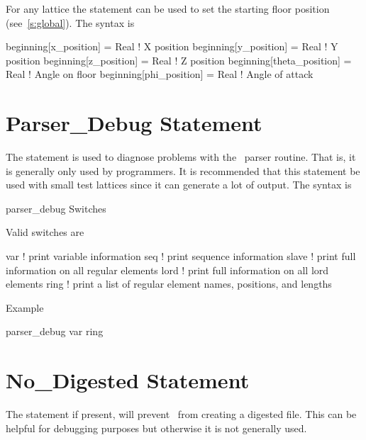 For any lattice the  statement can be used to set the starting floor position 
(see~\ref{s:global}). The syntax is
\begin{example}
  beginning[x_position]     = Real  ! X position
  beginning[y_position]     = Real  ! Y position
  beginning[z_position]     = Real  ! Z position
  beginning[theta_position] = Real  ! Angle on floor
  beginning[phi_position]   = Real  ! Angle of attack
\end{example}

\section{Parser\_Debug Statement}

The  statement is used to diagnose problems with the \bmad\ parser 
routine. That is, it is generally only used by programmers. 
It is recommended that this
statement be used with small test lattices since it can generate a lot of output.
The syntax is
\begin{example}
  parser\_debug Switches
\end{example}
Valid switches are
\begin{example}
  var     ! print variable information
  seq     ! print sequence information
  slave   ! print full information on all regular elements
  lord    ! print full information on all lord elements
  ring    ! print a list of regular element names, positions, and lengths
\end{example}
Example
\begin{example}
  parser\_debug var ring
\end{example}


\section{No\_Digested Statement}

The  statement if present, will prevent \bmad\ from 
creating a digested file. This can be helpful for debugging purposes but
otherwise it is not generally used.


